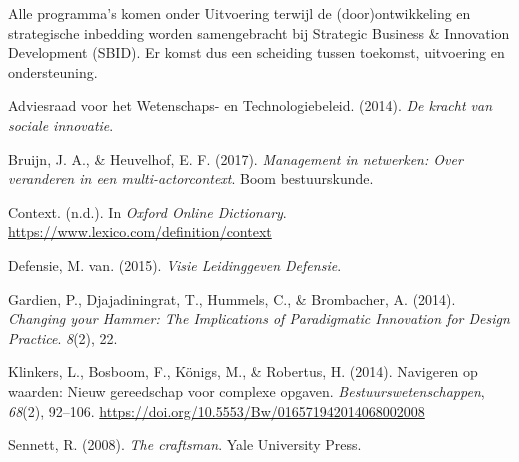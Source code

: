\documentclass[
]{book}
\newlength{\cslhangindent}
\newenvironment{CSLReferences}[2] %
 {%
  \setlength{\parindent}{0pt}
  \ifodd #1 \everypar{\setlength{\hangindent}{\cslhangindent}}\ignorespaces\fi
  \ifnum #2 > 0
  \setlength{\parskip}{#2\baselineskip}
  \fi
 }%
 {}
\begin{document}
Alle programma's komen onder Uitvoering terwijl de (door)ontwikkeling en strategische inbedding worden samengebracht bij Strategic Business \& Innovation Development (SBID). Er komst dus een scheiding tussen toekomst, uitvoering en ondersteuning.

\hypertarget{refs}{}
\begin{CSLReferences}{1}{0}
\leavevmode{}%
Adviesraad voor het Wetenschaps- en Technologiebeleid. (2014). \emph{De kracht van sociale innovatie}.

\leavevmode{}%
Bruijn, J. A., \& Heuvelhof, E. F. (2017). \emph{Management in netwerken: Over veranderen in een multi-actorcontext}. Boom bestuurskunde.

\leavevmode{}%
Context. (n.d.). In \emph{Oxford Online Dictionary}. \url{https://www.lexico.com/definition/context}

\leavevmode{}%
Defensie, M. van. (2015). \emph{Visie {Leidinggeven} {Defensie}}.

\leavevmode{}%
Gardien, P., Djajadiningrat, T., Hummels, C., \& Brombacher, A. (2014). \emph{Changing your {Hammer}: {The} {Implications} of {Paradigmatic} {Innovation} for {Design} {Practice}}. \emph{8}(2), 22.

\leavevmode{}%
Klinkers, L., Bosboom, F., Königs, M., \& Robertus, H. (2014). Navigeren op waarden: Nieuw gereedschap voor complexe opgaven. \emph{Bestuurswetenschappen}, \emph{68}(2), 92--106. \url{https://doi.org/10.5553/Bw/016571942014068002008}

\leavevmode{}%
Sennett, R. (2008). \emph{The craftsman}. Yale University Press.

\end{CSLReferences}
\end{document}
